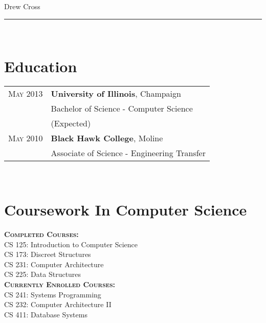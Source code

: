 \documentclass[10pt]{article}
\begin{document}
\color{text1}

    \par{\centering
        {\sffamily\Huge Drew Cross
    }\\[10pt]
    \par{\centering
    \hrule
    \\[35pt]


\begin{minipage}[t]{0.5\textwidth} 
    \vspace{0pt}



\section{Education}

\begin{tabular}{rl}

    \textsc{May} 2013 & \textbf{University of Illinois}, Champaign \\
     & Bachelor of Science - Computer Science \\
& (Expected) \\[5pt]

     \textsc{May} 2010 & \textbf{Black Hawk College}, Moline\\
     & Associate of Science - Engineering Transfer\\


\end{tabular}\\[10pt]


\section{Coursework In Computer Science}
    \raggedright
    \textsc{\textbf{Completed Courses:}}\\[1pt]
    CS 125: Introduction to Computer Science\\
    CS 173: Discreet Structures\\
    CS 231: Computer Architecture \\
    CS 225: Data Structures \\[10pt]
    \textsc{\textbf{Currently Enrolled Courses:}}\\[1pt]
    CS 241: Systems Programming\\
    CS 232: Computer Architecture II \\
    CS 411: Database Systems \\[15pt]



\end{minipage}}}
\end{document}
